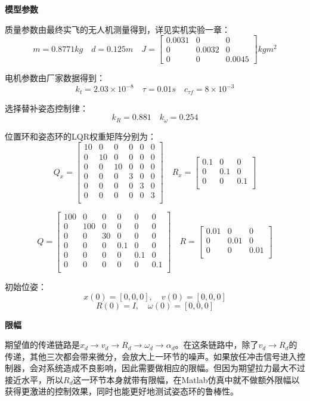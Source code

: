   \textbf{模型参数}

  质量参数由最终实飞的无人机测量得到，详见实机实验一章：
  $$m=0.8771kg \quad d=0.125m \quad J=\begin{bmatrix}
    0.0031   &      0  &       0\\
    0 &   0.0032      &   0\\
    0  &       0   & 0.0045
  \end{bmatrix}kg m^2$$

  电机参数由厂家数据得到：
  $$k_t=2.03\times 10^{-8} \quad 
  \tau=0.01s \quad
  c_{\tau f}=8\times 10^{-3}$$

  选择替补姿态控制律：
  $$k_R=0.881 \quad k_\omega=0.254$$

  位置环和姿态环的LQR权重矩阵分别为：
  $$Q_x=\begin{bmatrix}
    10&0&0&0&0&0\\
    0&10&0&0&0&0\\
    0&0&10&0&0&0\\
    0&0&0&3&0&0\\
    0&0&0&0&3&0\\
    0&0&0&0&0&3\\
  \end{bmatrix} \quad R_x=\begin{bmatrix}
    0.1 &0 &0\\
    0 &0.1 &0\\
    0 &0 &0.1\\
  \end{bmatrix}$$

  $$Q=\begin{bmatrix}
    100&0&0&0&0&0\\
    0&100&0&0&0&0\\
    0&0&30&0&0&0\\
    0&0&0&0.1&0&0\\
    0&0&0&0&0.1&0\\
    0&0&0&0&0&0.1\\
  \end{bmatrix} \quad R=\begin{bmatrix}
    0.01 &0 &0\\
    0 &0.01 &0\\
    0 &0 &0.01\\
  \end{bmatrix}$$

  初始位姿：
  $$x(0)=[0,0,0],\quad v(0)=[0,0,0]$$
  $$R(0)=I , \quad \omega(0)=[0,0,0]$$

  \textbf{限幅}

  期望值的传递链路是$x_d \to v_d \to R_d \to \omega_d \to \alpha_d$。在这条链路中，除了$ v_d \to R_d$的传递，其他三次都会带来微分，会放大上一环节的噪声。如果放任冲击信号进入控制器，会对系统造成不良影响，因此需要做相应的限幅。但因为期望拉力最大不过接近水平，所以$R_d$这一环节本身就带有限幅，在Matlab仿真中就不做额外限幅以获得更激进的控制效果，同时也能更好地测试姿态环的鲁棒性。

